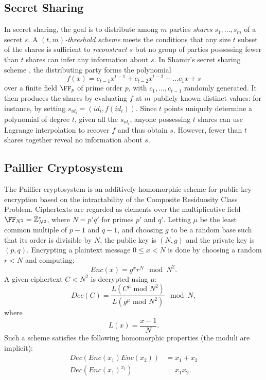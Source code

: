 \subsection{Secret Sharing}

In secret sharing, the goal is to distribute among $m$ parties \emph{shares
}$s_{1},\ldots,s_{m}$ of a secret $s$. A \emph{$(t,m)$-threshold
scheme} meets the conditions that any size $t$ subset of the shares is sufficient to \emph{reconstruct
}$s$ but no group of parties possessing fewer than $t$ shares can
infer any information about $s$. In Shamir's secret sharing scheme
\cite{Shamir}, the distributing party forms the polynomial 
\[
f(x)=c_{t-1}x^{t-1}+c_{t-2}x^{t-2}+\ldots c_{1}x+s
\]
over a finite field $\FF_p$ of prime order $p$, with $c_{1},\ldots, c_{t-1}$ randomly
generated. It then produces the shares by evaluating $f$ at $m$
publicly-known distinct values: for instance, by setting $s_{id_i}=(id_i,f(id_i))$.
Since $t$ points uniquely determine a polynomial of degree $t$,
given all the $s_{id_i}$, anyone possessing $t$ shares can use Lagrange
interpolation to recover $f$ and thus obtain $s$. However, fewer
than $t$ shares together reveal no information about $s$.

\subsection{Paillier Cryptosystem}

The Paillier cryptosystem \cite{Paillier} is an additively homomorphic
scheme for public key encryption based on the intractability of the
Composite Residuosity Class Problem. Ciphertexts are regarded as elements
over the multiplicative field $\FF_{N^2} = \mathbb{Z}_{N^{2}}^{*}$, where $N=p'q'$
for primes $p'$ and $q'$. Letting $\mu$ be the least common multiple of $p-1$ and $q-1$,
and choosing $g$ to be a random base such that its order is divisible
by $N$, the public key is $(N,g)$ and the private key is $(p,q)$.
Encrypting a plaintext message $0\leq x<N$ is done by choosing a random
$r<N$ and computing: 
\[
Enc(x)=g^{x}r^{N}\mod N^{2}.
\]
A given ciphertext $C<N^{2}$ is decrypted using $\mu$: 
\[
Dec(C)=\frac{L(C^{\mu}\text{ mod }N^{2})}{L(g^{\mu}\text{ mod }N^{2})}\mod N,
\]
where 
\[
L(x)=\frac{x-1}{N}.
\]
Such a scheme satisfies the following homomorphic properties (the
moduli are implicit): 
\begin{align*}
Dec(Enc(x_{1})Enc(x_{2})) & =x_{1}+x_{2}\\
Dec(Enc(x_{1})^{x_{1}}) & =x_{1}x_{2}.
\end{align*}


